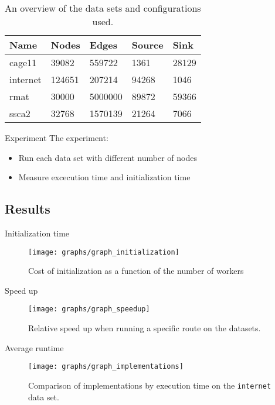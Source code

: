 \documentclass{beamer}
\begin{document}
\begin{frame}
\begin{table}
	\centering

	\begin{tabular}{l | l | l | l | l}
		Name & Nodes & Edges & Source & Sink \\
		\hline
		cage11 & 39082 & 559722 & 1361 & 28129 \\
		internet & 124651 & 207214 & 94268 & 1046 \\
		rmat& 30000 & 5000000 & 89872 & 59366 \\
		ssca2 & 32768 & 1570139 & 21264 & 7066 \\
	\end{tabular}
	\caption{An overview of the data sets and configurations used.}
\end{table}
\end{frame}

\begin{frame}{Experiment}
	The experiment:
	\begin{itemize}
		\item Run each data set with different number of nodes
		\item Measure excecution time and initialization time
	\end{itemize}
\end{frame}

\subsection{Results}
\begin{frame}{Initialization time}
	\begin{figure}
		\texttt{[image: graphs/graph\_initialization]}
		\caption{Cost of initialization as a function of the number of workers}
		\label{fig:initialization_time}
	\end{figure}
\end{frame}

\begin{frame}{Speed up}
	\begin{figure}
		\texttt{[image: graphs/graph\_speedup]}
		\caption{Relative speed up when running a specific route on the datasets.}
		\label{fig:speedup_cage11}
\end{figure}
\end{frame}

\begin{frame}{Average runtime}
	\begin{figure}[b!]
		\centering
		\texttt{[image: graphs/graph\_implementations]}
		\caption{Comparison of implementations by execution time on the \texttt{internet} data set.}
		\label{fig:implmementations}
	\end{figure}
\end{frame}
\end{document}
